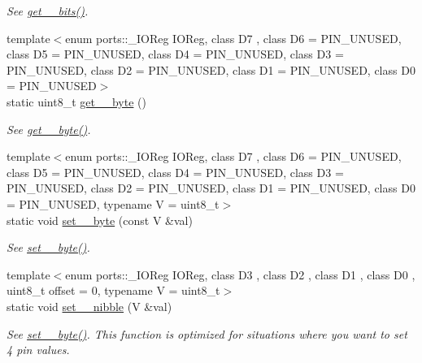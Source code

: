 \begin{DoxyCompactItemize}
\begin{DoxyCompactList}\small\item\em See \hyperlink{namespaceports_a9a1959ec95780c00a964b174a27b2a37}{get\+\_\+\_\+bits()}. \end{DoxyCompactList}\item 
{\footnotesize template$<$enum ports\+::\+\_\+\+I\+O\+Reg I\+O\+Reg, class D7 , class D6  = P\+I\+N\+\_\+\+U\+N\+U\+S\+ED, class D5  = P\+I\+N\+\_\+\+U\+N\+U\+S\+ED, class D4  = P\+I\+N\+\_\+\+U\+N\+U\+S\+ED, class D3  = P\+I\+N\+\_\+\+U\+N\+U\+S\+ED, class D2  = P\+I\+N\+\_\+\+U\+N\+U\+S\+ED, class D1  = P\+I\+N\+\_\+\+U\+N\+U\+S\+ED, class D0  = P\+I\+N\+\_\+\+U\+N\+U\+S\+ED$>$ }\\static uint8\+\_\+t \hyperlink{namespaceports_abcf67102d107c0aaad21fbb9f15563ae}{get\+\_\+\_\+byte} ()
\begin{DoxyCompactList}\small\item\em See \hyperlink{namespaceports_ae7d1ffc9ed6454ca61b006ffe43e4e6e}{get\+\_\+\_\+byte()}. \end{DoxyCompactList}\item 
{\footnotesize template$<$enum ports\+::\+\_\+\+I\+O\+Reg I\+O\+Reg, class D7 , class D6  = P\+I\+N\+\_\+\+U\+N\+U\+S\+ED, class D5  = P\+I\+N\+\_\+\+U\+N\+U\+S\+ED, class D4  = P\+I\+N\+\_\+\+U\+N\+U\+S\+ED, class D3  = P\+I\+N\+\_\+\+U\+N\+U\+S\+ED, class D2  = P\+I\+N\+\_\+\+U\+N\+U\+S\+ED, class D1  = P\+I\+N\+\_\+\+U\+N\+U\+S\+ED, class D0  = P\+I\+N\+\_\+\+U\+N\+U\+S\+ED, typename V  = uint8\+\_\+t$>$ }\\static void \hyperlink{namespaceports_a61265646961334c58df6d4ed66e290d0}{set\+\_\+\_\+byte} (const V \&val)
\begin{DoxyCompactList}\small\item\em See \hyperlink{namespaceports_a7034c689dd509dc9c11ba8be46a26fd0}{set\+\_\+\_\+byte()}. \end{DoxyCompactList}\item 
{\footnotesize template$<$enum ports\+::\+\_\+\+I\+O\+Reg I\+O\+Reg, class D3 , class D2 , class D1 , class D0 , uint8\+\_\+t offset = 0, typename V  = uint8\+\_\+t$>$ }\\static void \hyperlink{namespaceports_af6f06d849f89492a6d3603f926c4595b}{set\+\_\+\_\+nibble} (V \&val)
\begin{DoxyCompactList}\small\item\em See \hyperlink{namespaceports_a7034c689dd509dc9c11ba8be46a26fd0}{set\+\_\+\_\+byte()}. This function is optimized for situations where you want to set 4 pin values. \end{DoxyCompactList}\end{DoxyCompactItemize}


